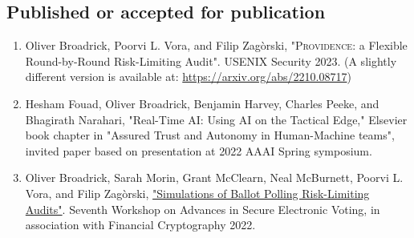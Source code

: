 \documentclass[letterpaper]{article}
\begin{document}
\subsection*{Published or accepted for publication}
\begin{enumerate}
\item
Oliver Broadrick, Poorvi L. Vora, and Filip Zag\`{o}rski, "\textsc{Providence}: a Flexible Round-by-Round Risk-Limiting Audit". USENIX Security 2023. (A slightly different version is available at: \newline \href{https://arxiv.org/abs/2210.08717}{https://arxiv.org/abs/2210.08717})
\item
Hesham Fouad, Oliver Broadrick, Benjamin Harvey, Charles Peeke, and Bhagirath Narahari, "Real-Time AI: Using AI on the Tactical Edge," Elsevier book chapter in "Assured Trust and Autonomy in Human-Machine teams", invited paper based on presentation at 2022 AAAI Spring symposium.
\item Oliver Broadrick, Sarah Morin, Grant McClearn, Neal McBurnett, Poorvi L. Vora, and Filip Zag\`{o}rski, \href{https://oliverbroadrick.com/papers/simulations-of-ballot-polling-rlas.pdf}{"Simulations of Ballot Polling Risk-Limiting Audits"}. Seventh Workshop on Advances in Secure Electronic Voting, in association with Financial Cryptography 2022.
\end{enumerate}

\bigskip
\end{document}
